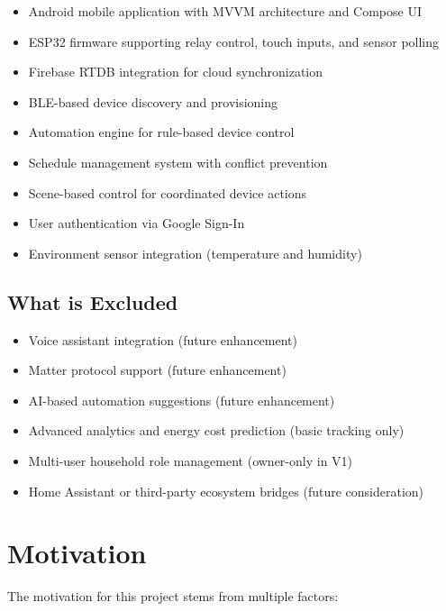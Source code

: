 \begin{itemize}
    \item Android mobile application with MVVM architecture and Compose UI
    \item ESP32 firmware supporting relay control, touch inputs, and sensor polling
    \item Firebase RTDB integration for cloud synchronization
    \item BLE-based device discovery and provisioning
    \item Automation engine for rule-based device control
    \item Schedule management system with conflict prevention
    \item Scene-based control for coordinated device actions
    \item User authentication via Google Sign-In
    \item Environment sensor integration (temperature and humidity)
\end{itemize}

\subsection{What is Excluded}

\begin{itemize}
    \item Voice assistant integration (future enhancement)
    \item Matter protocol support (future enhancement)
    \item AI-based automation suggestions (future enhancement)
    \item Advanced analytics and energy cost prediction (basic tracking only)
    \item Multi-user household role management (owner-only in V1)
    \item Home Assistant or third-party ecosystem bridges (future consideration)
\end{itemize}

\section{Motivation}

The motivation for this project stems from multiple factors:

